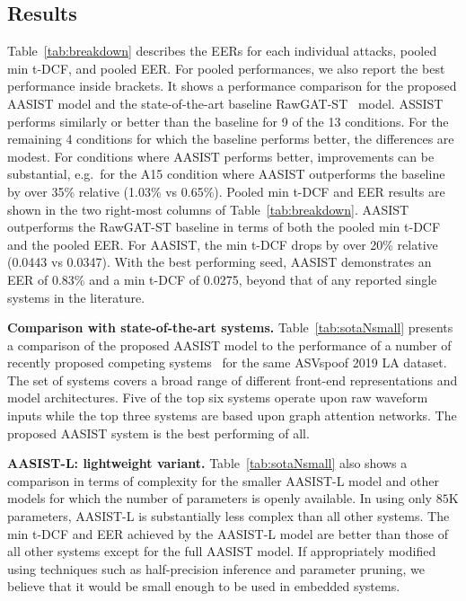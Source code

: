 \documentclass{article}
\newcommand{\newpara}[1]{\vspace{8pt}\noindent\textbf{#1}}
\begin{document}
\subsection{Results}
\label{ssec:result}
Table~\ref{tab:breakdown} describes the EERs for each individual attacks, pooled min t-DCF, and pooled EER. 
For pooled performances, we also report the best performance inside brackets. 
It shows a performance comparison for the proposed AASIST model and the state-of-the-art baseline RawGAT-ST~\cite{tak2021end} model. 
ASSIST performs similarly or better than the baseline for 9 of the 13 conditions.  For the remaining 4 conditions for which the baseline performs better, the differences are modest.  For conditions where AASIST performs better, improvements can be substantial, e.g.\ for the A15 condition where AASIST outperforms the baseline by over 35\% relative (1.03\% vs 0.65\%).
Pooled min t-DCF and EER results are shown in the two right-most columns of Table~\ref{tab:breakdown}. AASIST outperforms the RawGAT-ST baseline in terms of both the pooled min t-DCF and the pooled EER.  For AASIST, the min t-DCF drops by over 20\% relative (0.0443 vs 0.0347).
With the best performing seed, AASIST demonstrates an EER of 0.83\% and a min t-DCF of 0.0275, beyond that of any reported single systems in the literature. 

\newpara{Comparison with state-of-the-art systems.}
Table~\ref{tab:sotaNsmall} presents a comparison of the proposed AASIST model to the performance of a number of recently proposed competing systems~\cite{tak2021graph,tak2021end,wang21fa_interspeech,zhang2021effect,hua2021towards,ge2021raw,li2021channelwise,chen2020generalization,luo2021capsule,zhang2021one,li2021replay,ma2021improved,tak2020spoofing,ge2021} for the same ASVspoof 2019 LA dataset. 
The set of systems covers a broad range of different front-end representations and model architectures.
Five of the top six systems operate upon raw waveform inputs while the top three systems are based upon graph attention networks. 
The proposed AASIST system is the best performing of all.

\newpara{AASIST-L: lightweight variant.}
Table~\ref{tab:sotaNsmall} also shows a comparison in terms of complexity for the smaller AASIST-L model and other models for which the number of parameters is openly available. 
In using only $85$K parameters, AASIST-L is substantially less complex than all other systems.
The min t-DCF and EER achieved by the AASIST-L model are better than those of all other systems except for the full AASIST model.
If appropriately modified using techniques such as half-precision inference and parameter pruning, we believe that it would be small enough to be used in embedded systems. 
\end{document}
